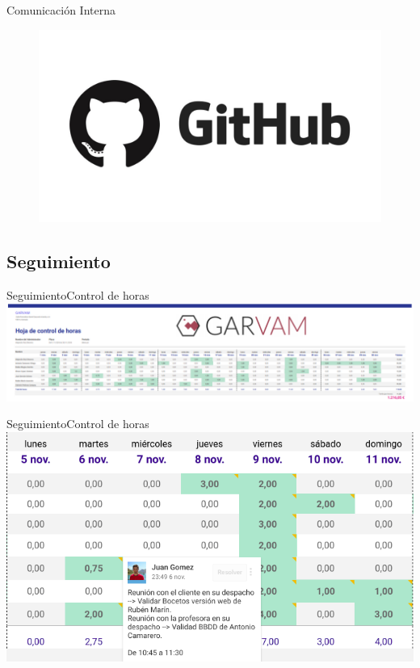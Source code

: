 \documentclass{beamer}
\begin{document}
\begin{frame}{Comunicaci\'on Interna}
\begin{figure}[H]
	\hspace{0.7cm}
	\includegraphics[width=0.35\paperwidth, height=0.4\paperheight]{images_latex/github}
	\end{figure}

\end{frame}

\subsection{Seguimiento}
	\begin{frame}{Seguimiento}{Control de horas}
	\centering
	\includegraphics[width=0.8\paperwidth]{images_latex/seguimiento/tabla_horas}
	\end{frame}

	\begin{frame}{Seguimiento}{Control de horas}
	\centering
	\includegraphics[width=0.8\paperwidth]{images_latex/seguimiento/tabla_horas_zoomed}
	\end{frame}
\end{document}
